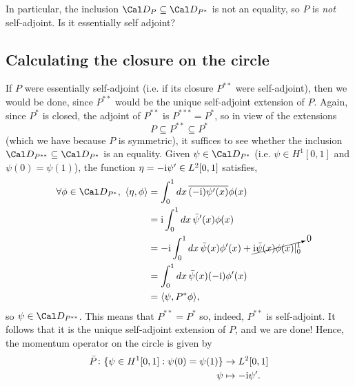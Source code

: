 In particular, the inclusion \(\Cal D_P\subseteq \Cal D_{P^{*}}\) is
not an equality, so \(P\) is \emph{not} self-adjoint.
Is it essentially self adjoint?

\subsection{Calculating the closure on the circle}

If \(P\) were essentially self-adjoint (i.e. if its closure \(P^{**}\)
were self-adjoint), then we would be done, since \(P^{**}\) would be
the unique self-adjoint extension of \(P\).
Again, since \(P^*\) is closed, the adjoint of \(P^{**}\) is
\(P^{***}=P^{*}\), so in view of the extensions
\begin{equation}
  P\subseteq P^{**} \subseteq P^*
\end{equation}
(which we have because \(P\) is symmetric),
it suffices to see whether the inclusion \(\Cal D_{P^{**}}\subseteq
\Cal D_{P^*}\) is an equality.
Given \(\psi\in\Cal D_{P^*}\) (i.e. \(\psi\in H^{1}[0,1]\) and
\(\psi(0)=\psi(1)\)), the function \(\eta=-\mathrm{i}\psi'\in L^{2}[0,1]\)
satisfies,
\begin{align}
  \forall\phi\in\Cal D_{P^*}, \
  \langle \eta,\phi\rangle
  &= \int_{0}^{1}dx\, \overline{(-\ic)\psi'(x)}\phi(x) \\
  &= \ic\int_{0}^{1}dx\, \bar\psi'(x)\phi(x) \\
  &= -\ic\int_{0}^{1}dx\, \bar\psi(x)\phi'(x)
    + \cancelto{0}{\ic\bar\psi(x)\phi(x)|_{0}^{1}} \\
  &= \int_{0}^{1}dx\, \bar\psi(x)(-\ic)\phi'(x) \\
  &= \langle \psi,P^*\phi\rangle
,\end{align}
so \(\psi\in\Cal D_{P^{**}}\). This means that \(P^{**}=P^*\) so,
indeed, \(P^{**}\) is self-adjoint. It follows that it is the unique
self-adjoint extension of \(P\), and we are done!
Hence, the momentum operator on the circle is given by
\begin{align}
  \bar P \colon \{\psi\in H^1[0,1] : \psi(0)=\psi(1)\} &\to L^{2}[0,1]
  \\
  \psi &\mapsto -\mathrm{i}\psi'
.\end{align}





